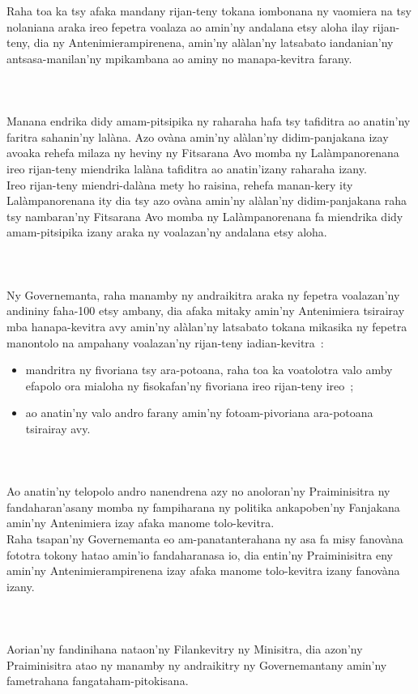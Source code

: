 \documentclass[12pt]{article}
\newcounter{laharana}
\newcommand{\andininy}[0]{
  \paragraph{%
    \NoCaseChange{%
      Andininy~\addtocounter{laharana}{1}\thelaharana.}\label{and:\thelaharana}~%
  }%
}
\begin{document}
\noindent
Raha toa ka tsy afaka mandany rijan-teny tokana iombonana ny vaomiera na tsy
nolaniana araka ireo fepetra voalaza ao amin'ny andalana etsy aloha ilay
rijan-teny, dia ny Antenimierampirenena, amin'ny alàlan'ny latsabato
iandanian'ny antsasa-manilan'ny mpikambana ao aminy no manapa-kevitra farany.

\andininy{}Manana endrika didy amam-pitsipika ny raharaha hafa tsy tafiditra ao
anatin'ny faritra sahanin'ny lalàna. Azo ovàna amin'ny alàlan'ny didim-panjakana
izay avoaka rehefa milaza ny heviny ny Fitsarana Avo momba ny Lalàmpanorenana
ireo rijan-teny miendrika lalàna tafiditra ao anatin'izany raharaha izany.\\

\noindent
Ireo rijan-teny miendri-dalàna mety ho raisina, rehefa manan-kery ity
Lalàmpanorenana ity dia tsy azo ovàna amin'ny alàlan'ny didim-panjakana raha tsy
nambaran'ny Fitsarana Avo momba ny Lalàmpanorenana fa miendrika didy
amam-pitsipika izany araka ny voalazan'ny andalana etsy aloha.

\andininy{}Ny Governemanta, raha manamby ny andraikitra araka ny fepetra
voalazan'ny andininy faha-100 etsy ambany, dia afaka mitaky amin'ny Antenimiera
tsirairay mba hanapa-kevitra avy amin'ny alàlan'ny latsabato tokana mikasika ny
fepetra manontolo na ampahany voalazan'ny rijan-teny iadian-kevitra~:

\begin{itemize}
\item mandritra ny fivoriana tsy ara-potoana, raha toa ka voatolotra valo amby
  efapolo ora mialoha ny fisokafan'ny fivoriana ireo rijan-teny ireo~;

\item ao anatin'ny valo andro farany amin'ny fotoam-pivoriana ara-potoana
  tsirairay avy.
\end{itemize}

\andininy{}Ao anatin'ny telopolo andro nanendrena azy no anoloran'ny
Praiminisitra ny fandaharan'asany momba ny fampiharana ny politika ankapoben'ny
Fanjakana amin'ny Antenimiera izay afaka manome tolo-kevitra.\\

\noindent
Raha tsapan'ny Governemanta eo am-panatanterahana ny asa fa misy fanovàna
fototra tokony hatao amin'io fandaharanasa io, dia entin'ny Praiminisitra eny
amin'ny Antenimierampirenena izay afaka manome tolo-kevitra izany fanovàna
izany.

\andininy{}Aorian'ny fandinihana nataon'ny Filankevitry ny Minisitra, dia
azon'ny Praiminisitra atao ny manamby ny andraikitry ny Governemantany amin'ny
fametrahana fangataham-pitokisana.\\
\end{document}
